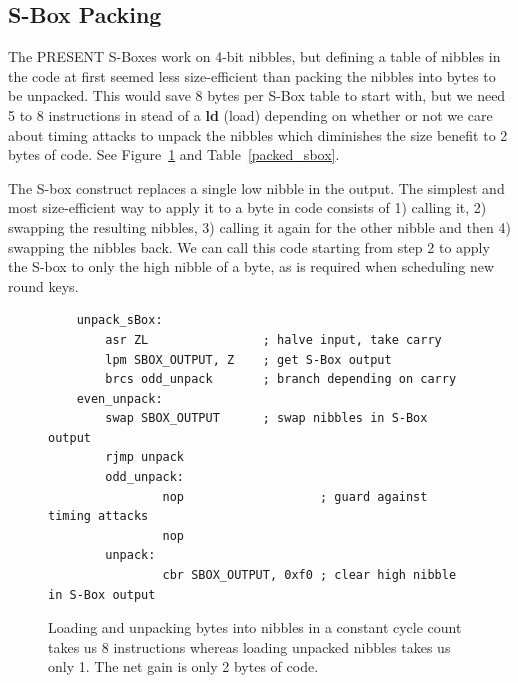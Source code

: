 \documentclass[11pt]{llncs2e} %
\begin{document}
\subsection{S-Box Packing}\label{sbox_packing}
The PRESENT S-Boxes work on 4-bit nibbles, but defining a table of nibbles in the code at first seemed less size-efficient than packing the nibbles into bytes to be unpacked.
This would save 8 bytes per S-Box table to start with, but we need 5 to 8 instructions in stead of a \textbf{ld} (load) depending on whether or not we care about timing attacks to unpack the nibbles which diminishes the size benefit to 2 bytes of code. See Figure~\ref{unpacking_code} and Table~\ref{packed_sbox}.

The S-box construct replaces a single low nibble in the output.
The simplest and most size-efficient way to apply it to a byte in code consists of 1) calling it, 2) swapping the resulting nibbles, 3) calling it again for the other nibble and then 4) swapping the nibbles back.
We can call this code starting from step 2 to apply the S-box to only the high nibble of a byte, as is required when scheduling new round keys.

\begin{figure}[H]
\centering
\begin{lstlisting}
	unpack_sBox:
		asr ZL                ; halve input, take carry
		lpm SBOX_OUTPUT, Z    ; get S-Box output
		brcs odd_unpack       ; branch depending on carry
	even_unpack:
		swap SBOX_OUTPUT      ; swap nibbles in S-Box output
		rjmp unpack
        odd_unpack:
                nop                   ; guard against timing attacks
                nop
        unpack:
                cbr SBOX_OUTPUT, 0xf0 ; clear high nibble in S-Box output
	\end{lstlisting}
	\caption{\footnotesize Loading and unpacking bytes into nibbles in a constant cycle count takes us 8 instructions whereas loading unpacked nibbles takes us only 1. The net gain is only 2 bytes of code.}
\label{unpacking_code}
\end{figure}
\end{document}

